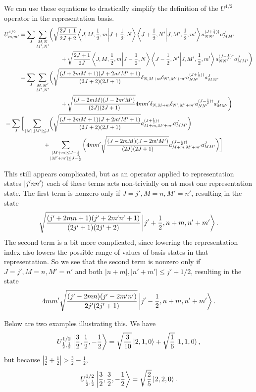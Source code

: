 \documentclass[11pt,reqno]{amsart}
\numberwithin{equation}{section}
\begin{document}
	We can use these equations to drastically simplify the definition of the $U^{1/2}$ operator in the representation basis.
	\begin{align*}
		U^{1/2}_{m,m'}=\sum_{J} \sum_{\substack{M,N\\M',N'}}  &\bigg( \sqrt{\frac{2J+1}{2J+2}}\braket{J,M,\frac{1}{2},m}{J+\frac{1}{2},N}\braket{J+\frac{1}{2},N'}{J,M',\frac{1}{2},m'}a^{(J+\frac{1}{2})\dagger}_{NN'}a^J_{MM'} \\
		&\qquad+\sqrt{\frac{2J+1}{2J}}\braket{J,M,\frac{1}{2},m}{J-\frac{1}{2},N}\braket{J-\frac{1}{2},N'}{J,M',\frac{1}{2},m'}a^{(J-\frac{1}{2})\dagger}_{NN'}a^J_{MM'} \bigg) \\
		=\sum_{J} \sum_{\substack{M,M'\\M',N'}} &\bigg( \sqrt{\frac{(J+2mM+1)(J+2m'M'+1)}{(2J+2)(2J+1)}}\delta_{N,M+m}\delta_{N',M'+m'} a^{(J+\frac{1}{2})\dagger}_{NN'}a^J_{MM'} \\
		&\qquad+\sqrt{\frac{(J-2mM)(J-2m'M')}{(2J)(2J+1)}}4mm'\delta_{N,M+m}\delta_{N',M'+m'}a^{(J-\frac{1}{2})\dagger}_{NN'}a^J_{MM'} \bigg) \\
		=\sum_{J} \bigg[\sum_{|M|,|M'|\leq J} &\bigg( \sqrt{\frac{(J+2mM+1)(J+2m'M'+1)}{(2J+2)(2J+1)}} a^{(J+\frac{1}{2})\dagger}_{M+m,M'+m'}a^J_{MM'}\bigg) \\
		+&\sum_{\substack{|M+m|\leq J-\frac{1}{2}\\|M'+m'|\leq J-\frac{1}{2}}} \bigg(4mm'\sqrt{\frac{(J-2mM)(J-2m'M')}{(2J)(2J+1)}}a^{(J-\frac{1}{2})\dagger}_{M+m,M'+m'}a^J_{MM'} \bigg)\bigg] \\
	\end{align*}
	
	This still appears complicated, but as an operator applied to representation states $\ket{j'nn'}$ each of these terms acts non-trivially on at most one representation state.
	The first term is nonzero only if $J=j',M=n,M'=n'$, resulting in the state
		\[ \sqrt{\frac{(j'+2mn+1)(j'+2m'n'+1)}{(2j'+1)(2j'+2)}} \ket{j'+\frac{1}{2},n+m,n'+m'}.\]
	The second term is a bit more complicated, since lowering the representation index also lowers the possible range of values of basis states in that representation.
	So we see that the second term is nonzero only if $J=j',M=n,M'=n'$ and both $|n+m|,|n'+m'|\leq j'+1/2$, resulting in the state
		\[ 4mm' \sqrt{\frac{(j'-2mn)(j'-2m'n')}{2j'(2j'+1)}} \ket{j'-\frac{1}{2},n+m,n'+m'}. \]
	
	Below are two examples illustrating this.
	We have 
		\[U^{1/2}_{\frac{1}{2},\frac{1}{2}} \ket{\frac{3}{2},\frac{1}{2},-\frac{1}{2}} = \sqrt{\frac{3}{10}}\ket{2,1,0}+\sqrt{\frac{1}{6}}\ket{1,1,0}, \]
	but because $|\frac{3}{2}+\frac{1}{2}| > \frac{3}{2}-\frac{1}{2}$,
		\[ U^{1/2}_{\frac{1}{2},\frac{1}{2}} \ket{\frac{3}{2},\frac{3}{2},-\frac{1}{2}} = \sqrt{\frac{2}{5}}\ket{2,2,0}. \]
	\vspace{0.4cm}
	
\end{document}
